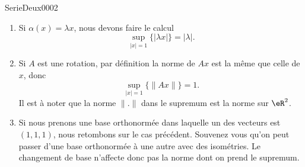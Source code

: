 
\begin{corrige}{SerieDeux0002}

	\begin{enumerate}

		\item
			Si $\alpha(x)=\lambda x$, nous devons faire le calcul
			\begin{equation}
				\sup_{| x |=1}\{ | \lambda x | \}=| \lambda |.
			\end{equation}
		\item
			Si $A$ est une rotation, par définition la norme de $Ax$ est la même que celle de $x$, donc
			\begin{equation}
				\sup_{| x |=1}\{ \| Ax \| \}=1.
			\end{equation}
			Il est à noter que la norme $\| . \|$ dans le supremum est la norme sur $\eR^2$.
		\item
			Si nous prenons une base orthonormée dans laquelle un des vecteurs est $(1,1,1)$, nous retombons sur le cas précédent. Souvenez vous qu'on peut passer d'une base orthonormée à une autre avec des isométries. Le changement de base n'affecte donc pas la norme dont on prend le supremum.

	\end{enumerate}

\end{corrige}
